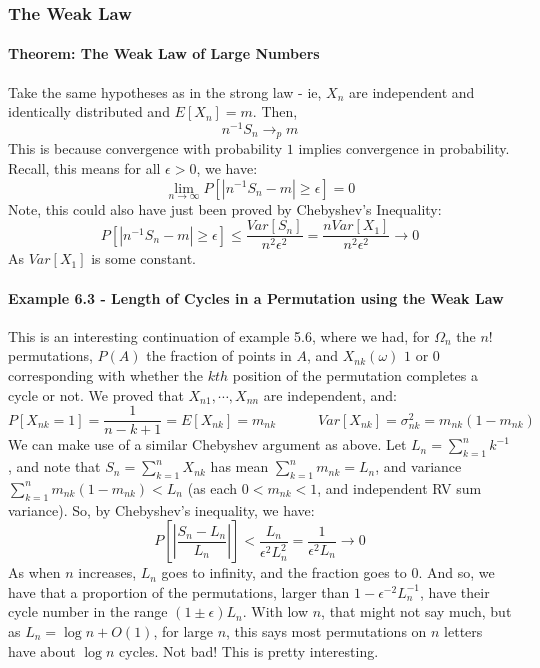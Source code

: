 \documentclass[12pt,a4paper]{article}
\newcommand{\1}[1]{\mathbbm{1}\left\{ #1 \right\}}
\begin{document}
\subsubsection{The Weak Law}
\paragraph{Theorem: The Weak Law of Large Numbers} Take the same hypotheses as in the strong law - ie, $X_n$ are independent and identically distributed and $E[X_n] = m$. Then,
$$
	n^{-1}S_n \to_p m
$$
This is because convergence with probability $1$ implies convergence in probability. Recall, this means for all $\epsilon > 0$, we have:
$$
	\lim_{n \to \infty} P[|n^{-1}S_n - m| \geq \epsilon] = 0
$$
Note, this could also have just been proved by Chebyshev's Inequality:
$$
	P[|n^{-1}S_n - m| \geq \epsilon] \leq \frac{Var[S_n]}{n^2\epsilon^2} = \frac{nVar[X_1]}{n^2\epsilon^2} \to 0
$$
As $Var[X_1]$ is some constant. 

\paragraph{Example 6.3 - Length of Cycles in a Permutation using the Weak Law} This is an interesting continuation of example 5.6, where we had, for $\Omega_n$ the $n!$ permutations, $P(A)$ the fraction of points in $A$, and $X_{nk}(\omega)$ $1$ or $0$ corresponding with whether the $kth$ position of the permutation completes a cycle or not. We proved that $X_{n1}, \cdots, X_{nn}$ are independent, and:
$$
	P[X_{nk} = 1] = \frac{1}{n-k+1} = E[X_{nk}] = m_{nk}
	\quad\quad\quad
	Var[X_{nk}] = \sigma^2_{nk} = m_{nk}(1-m_{nk})
$$
We can make use of a similar Chebyshev argument as above. Let $L_n = \sum_{k=1}^n k^{-1}$, and note that $S_n = \sum_{k=1}^n X_{nk}$ has mean $\sum_{k=1}^n m_{nk} = L_n$, and variance $\sum_{k=1}^n m_{nk}(1-m_{nk}) < L_n$ (as each $0 < m_{nk} < 1$, and independent RV sum variance). So, by Chebyshev's inequality, we have:
$$
	P\left[\left|\frac{S_n - L_n}{L_n}\right|\right] < \frac{L_n}{\epsilon^2L_n^2} = \frac{1}{\epsilon^2L_n} \to 0
$$
As when $n$ increases, $L_n$ goes to infinity, and the fraction goes to $0$. And so, we have that a proportion of the permutations, larger than $1 - \epsilon^{-2}L_n^{-1}$, have their cycle number in the range $(1 \pm \epsilon)L_n$. With low $n$, that might not say much, but as $L_n = \log n + O(1)$, for large $n$, this says most permutations on $n$ letters have about $\log n$ cycles. Not bad! This is pretty interesting.
\end{document}
